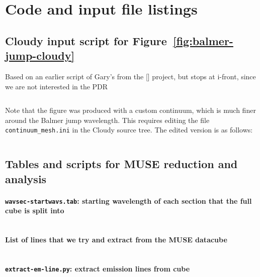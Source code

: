\documentclass[preprint]{aastex}
\newcommand\TsqDir{/Users/will/Work/RubinWFC3/Tsquared}
\begin{document}
\clearpage
\section{Code and input file listings}

\subsection{Cloudy input script for
  Figure~\ref{fig:balmer-jump-cloudy}}
\label{sec:cloudy-input-script}
Based on an earlier script of Gary's from the [] project,
but stops at i-front, since we are not interested in the PDR

\inputminted[fontsize=\footnotesize]{text}{\TsqDir/OrionStars/trap.in}

Note that the figure was produced with a custom continuum, which is
much finer around the Balmer jump wavelength.  This requires editing
the file \verb|continuum_mesh.ini| in the Cloudy source tree.  The
edited version is as follows:

\inputminted[fontsize=\footnotesize]{C}{/Users/will/Work/CLOUDY/git-svn/data/continuum_mesh_balmer_jump.ini}

\subsection{Tables and scripts for MUSE reduction and analysis}
\label{sec:MUSE-tabs-scripts}

\paragraph{\texttt{wavsec-startwavs.tab}: starting wavelength of each
  section that the full cube is split into}
\inputminted[fontsize=\footnotesize,obeytabs,tabsize=12]{text}{wavsec-startwavs.tab}

\paragraph{List of lines that we try and extract from the MUSE datacube}
\inputminted[fontsize=\footnotesize,obeytabs,tabsize=12]{text}{basic-line-list.tab}

\paragraph{\texttt{extract-em-line.py}: extract emission lines from cube}
\inputminted[fontsize=\footnotesize]{python}{extract-em-line.py}
\end{document}
